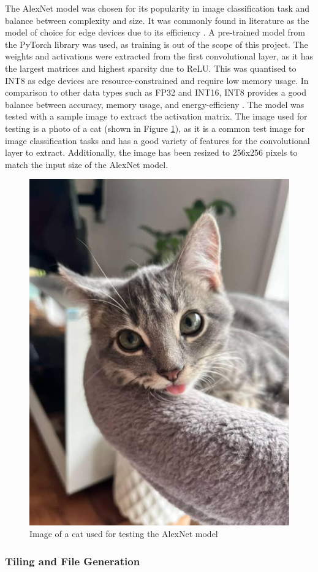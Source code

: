 \documentclass[12pt, a4paper, ukenglish]{article}
\newcommand{\catImage}{
    \begin{figure}[ht]
        \centering
        \includegraphics[width=0.3\linewidth]{figures/cat.jpg}
        \caption{Image of a cat used for testing the AlexNet model}
        \label{fig:cat}
    \end{figure}
}
\begin{document}
        The AlexNet model was chosen for its popularity in image classification task and balance between complexity and size. It was commonly found in literature as the model of choice for edge devices due to its efficiency \cite{parashar_scnn_2017,sun_sense_2023}. A pre-trained model from the PyTorch library was used, as training is out of the scope of this project. The weights and activations were extracted from the first convolutional layer, as it has the largest matrices and highest sparsity due to ReLU. This was quantised to INT8 as edge devices are resource-constrained and require low memory usage. In comparison to other data types such as FP32 and INT16, INT8 provides a good balance between accuracy, memory usage, and energy-efficieny \cite{gorvadiya_energy_2025}. The model was tested with a sample image to extract the activation matrix. The image used for testing is a photo of a cat (shown in Figure \ref{fig:cat}), as it is a common test image for image classification tasks and has a good variety of features for the convolutional layer to extract. Additionally, the image has been resized to 256x256 pixels to match the input size of the AlexNet model.

        \catImage
     

        \subsubsection{Tiling and File Generation}\label{sec: tiling}
        
\end{document}

